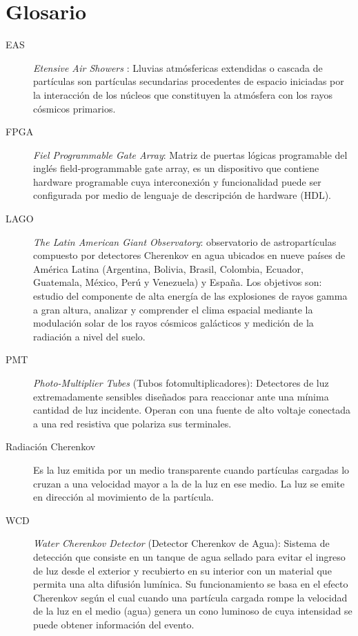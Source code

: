\chapter*{Glosario}

\begin{description}
\item[EAS ] \textit{Etensive Air Showers} : Lluvias atmósfericas extendidas o cascada de partículas son partículas secundarias procedentes de espacio iniciadas por la interacción de los núcleos que constituyen la atmósfera con los rayos cósmicos primarios.

\item[FPGA] \textit{Fiel Programmable Gate Array}: Matriz de puertas lógicas programable del inglés field-programmable gate array, es un dispositivo que contiene hardware programable cuya interconexión y funcionalidad puede ser configurada por medio de lenguaje de descripción de hardware (HDL).

\item[LAGO ] \textit{The Latin American Giant Observatory}: observatorio de astropartículas compuesto por detectores Cherenkov en agua ubicados en nueve países de América Latina (Argentina, Bolivia, Brasil, Colombia, Ecuador, Guatemala, México, Perú y Venezuela) y España.
Los objetivos son: estudio del componente de alta energía de las explosiones de rayos gamma a gran altura, analizar y comprender el clima espacial mediante la modulación solar de los rayos cósmicos galácticos y medición de la radiación a nivel del suelo.

\item[PMT] \textit{Photo-Multiplier Tubes} (Tubos fotomultiplicadores):
Detectores de luz extremadamente sensibles diseñados para reaccionar ante una mínima cantidad de luz incidente.
Operan con una fuente de alto voltaje conectada a una red resistiva que polariza sus terminales.
  
\item[Radiación Cherenkov ]
Es la luz emitida por un medio transparente cuando partículas cargadas lo cruzan a una velocidad mayor a la de la luz en ese medio.
La luz se emite en dirección al movimiento de la partícula.

\item[WCD] \textit{Water Cherenkov Detector} (Detector Cherenkov de Agua):
Sistema de detección que consiste en un tanque de agua sellado para evitar el ingreso de luz desde el exterior y recubierto en su interior con un material que permita una alta difusión lumínica. Su funcionamiento se basa en el efecto Cherenkov según el cual cuando una partícula cargada rompe la velocidad de la luz en el medio (agua) genera un cono luminoso de cuya intensidad se puede obtener información del evento.
  
\end{description}
